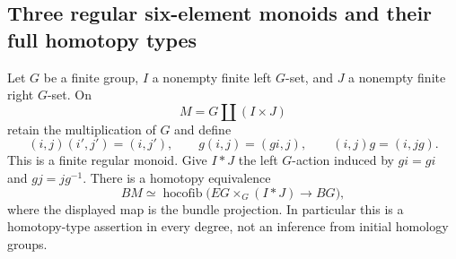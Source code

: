 \subsection{Three regular six-element monoids and their full homotopy types}

\begin{theorem}\label{E:group-band-cofiber}
Let $G$ be a finite group, $I$ a nonempty finite left $G$-set, and $J$ a
nonempty finite right $G$-set. On
\[
 M=G\amalg(I\times J)
\]
retain the multiplication of $G$ and define
\[
 (i,j)(i',j')=(i,j'),\qquad
 g(i,j)=(gi,j),\qquad (i,j)g=(i,jg).
\]
This is a finite regular monoid. Give $I*J$ the left $G$-action induced by
$g i=gi$ and $g j=jg^{-1}$. There is a homotopy equivalence
\[
 BM\simeq\operatorname{hocofib}
 \bigl(EG\times_G(I*J)\longrightarrow BG\bigr),
\]
where the displayed map is the bundle projection. In particular this is a
homotopy-type assertion in every degree, not an inference from initial
homology groups.
\end{theorem}

